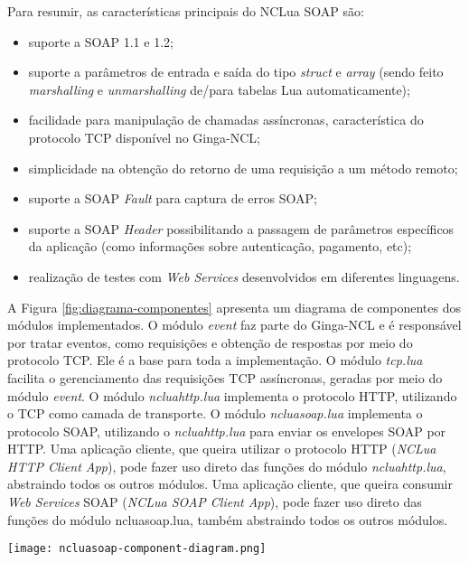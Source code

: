 Para resumir, as características principais do NCLua SOAP são:

\begin{itemize}
  \item suporte a SOAP 1.1 e 1.2;
  \item suporte a parâmetros de entrada e saída do tipo \textit{struct} e \textit{array}
   (sendo feito \textit{marshalling} e \textit{unmarshalling} de/para tabelas Lua automaticamente); 
  \item facilidade para manipulação de chamadas assíncronas, característica do protocolo TCP disponível no Ginga-NCL;
  \item simplicidade na obtenção do retorno de uma requisição a um método remoto;
  \item suporte a SOAP \textit{Fault} para captura de erros SOAP;
  \item suporte a SOAP \textit{Header}\cite{soap-spec} possibilitando a passagem de parâmetros específicos da aplicação 
  (como informações sobre autenticação, pagamento, etc);
	\item realização de testes com \textit{Web Services} desenvolvidos em diferentes linguagens.
\end{itemize}

A Figura \ref{fig:diagrama-componentes} apresenta um diagrama de componentes dos módulos implementados.
O módulo \textit{event} faz parte do Ginga-NCL e é responsável por tratar eventos, como requisições e obtenção de respostas
por meio do protocolo TCP. Ele é a base para toda a implementação. O módulo \textit{tcp.lua} facilita o gerenciamento
das requisições TCP assíncronas, geradas por meio do módulo \textit{event}. O módulo \textit{ncluahttp.lua }
implementa o protocolo HTTP, utilizando o TCP como camada de transporte. O módulo \textit{ncluasoap.lua}
implementa o protocolo SOAP, utilizando o \textit{ncluahttp.lua} para enviar os envelopes SOAP por HTTP.
Uma aplicação cliente, que queira utilizar o protocolo HTTP (\textit{NCLua HTTP Client App}), pode fazer uso direto das funções
do módulo \textit{ncluahttp.lua}, abstraindo todos os outros módulos. 
Uma aplicação cliente, que queira consumir
\textit{Web Services} SOAP (\textit{NCLua SOAP Client App}), 
pode fazer uso direto das funções do módulo ncluasoap.lua, também abstraindo todos os outros módulos.

\begin{center}
	\texttt{[image: ncluasoap-component-diagram.png]}
	\label{fig:diagrama-componentes}
\end{center}

